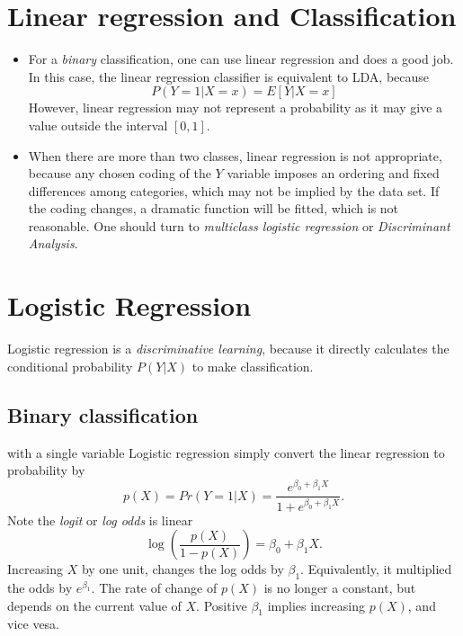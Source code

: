 \documentclass[
  letterpaper,
  DIV=11,
  numbers=noendperiod]{scrreprt}
\providecommand{\tightlist}{%
  \setlength{\itemsep}{0pt}\setlength{\parskip}{0pt}}\usepackage{longtable,booktabs,array}
\begin{document}
\section{Linear regression and
Classification}\label{linear-regression-and-classification}

\begin{itemize}
\tightlist
\item
  For a \emph{binary} classification, one can use linear regression and
  does a good job. In this case, the linear regression classifier is
  equivalent to LDA, because \[
  P(Y=1|X=x)= E[Y|X=x]
  \] However, linear regression may not represent a probability as it
  may give a value outside the interval \([0,1]\).
\item
  When there are more than two classes, linear regression is not
  appropriate, because any chosen coding of the \(Y\) variable imposes
  an ordering and fixed differences among categories, which may not be
  implied by the data set. If the coding changes, a dramatic function
  will be fitted, which is not reasonable. One should turn to
  \emph{multiclass logistic regression} or \emph{Discriminant Analysis}.
\end{itemize}

\section{Logistic Regression}\label{logistic-regression}

Logistic regression is a \emph{discriminative learning}, because it
directly calculates the conditional probability \(P(Y|X)\) to make
classification.

\subsection{Binary classification}\label{binary-classification}

with a single variable Logistic regression simply convert the linear
regression to probability by \[
p(X)=Pr(Y=1|X) =\frac{e^{\beta_0+\beta_1 X}}{1+ e^{\beta_0+\beta_1X}}.
\] Note the \emph{logit} or \emph{log odds} is linear \[
\log\left( \frac{p(X)}{1-p(X)}  \right) =\beta_0 +\beta_1 X.
\] Increasing \(X\) by one unit, changes the log odds by \(\beta_1\).
Equivalently, it multiplied the odds by \(e^{\beta_1}\). The rate of
change of \(p(X)\) is no longer a constant, but depends on the current
value of \(X\). Positive \(\beta_1\) implies increasing \(p(X)\), and
vice vesa.
\end{document}
